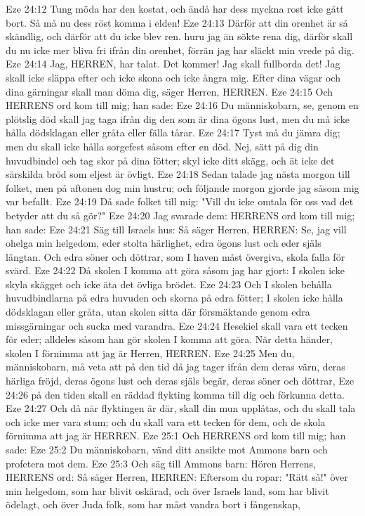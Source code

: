 Eze 24:12  Tung möda har den kostat, och ändå har dess myckna rost icke gått bort. Så må nu dess röst komma i elden!
Eze 24:13  Därför att din orenhet är så skändlig, och därför att du icke blev ren. huru jag än sökte rena dig, därför skall du nu icke mer bliva fri ifrån din orenhet, förrän jag har släckt min vrede på dig.
Eze 24:14  Jag, HERREN, har talat. Det kommer! Jag skall fullborda det! Jag skall icke släppa efter och icke skona och icke ångra mig. Efter dina vägar och dina gärningar skall man döma dig, säger Herren, HERREN.
Eze 24:15  Och HERRENS ord kom till mig; han sade:
Eze 24:16  Du människobarn, se, genom en plötslig död skall jag taga ifrån dig den som är dina ögons lust, men du må icke hålla dödsklagan eller gråta eller fälla tårar.
Eze 24:17  Tyst må du jämra dig; men du skall icke hålla sorgefest såsom efter en död. Nej, sätt på dig din huvudbindel och tag skor på dina fötter; skyl icke ditt skägg, och ät icke det särskilda bröd som eljest är övligt.
Eze 24:18  Sedan talade jag nästa morgon till folket, men på aftonen dog min hustru; och följande morgon gjorde jag såsom mig var befallt.
Eze 24:19  Då sade folket till mig: "Vill du icke omtala för oss vad det betyder att du så gör?"
Eze 24:20  Jag svarade dem: HERRENS ord kom till mig; han sade:
Eze 24:21  Säg till Israels hus: Så säger Herren, HERREN: Se, jag vill ohelga min helgedom, eder stolta härlighet, edra ögons lust och eder själs längtan. Och edra söner och döttrar, som I haven måst övergiva, skola falla för svärd.
Eze 24:22  Då skolen I komma att göra såsom jag har gjort: I skolen icke skyla skägget och icke äta det övliga brödet.
Eze 24:23  Och I skolen behålla huvudbindlarna på edra huvuden och skorna på edra fötter; I skolen icke hålla dödsklagan eller gråta, utan skolen sitta där försmäktande genom edra missgärningar och sucka med varandra.
Eze 24:24  Hesekiel skall vara ett tecken för eder; alldeles såsom han gör skolen I komma att göra. När detta händer, skolen I förnimma att jag är Herren, HERREN.
Eze 24:25  Men du, människobarn, må veta att på den tid då jag tager ifrån dem deras värn, deras härliga fröjd, deras ögons lust och deras själs begär, deras söner och döttrar,
Eze 24:26  på den tiden skall en räddad flykting komma till dig och förkunna detta.
Eze 24:27  Och då när flyktingen är där, skall din mun upplåtas, och du skall tala och icke mer vara stum; och du skall vara ett tecken för dem, och de skola förnimma att jag är HERREN.
Eze 25:1  Och HERRENS ord kom till mig; han sade:
Eze 25:2  Du människobarn, vänd ditt ansikte mot Ammons barn och profetera mot dem.
Eze 25:3  Och säg till Ammons barn: Hören Herrens, HERRENS ord: Så säger Herren, HERREN: Eftersom du ropar: "Rätt så!" över min helgedom, som har blivit oskärad, och över Israels land, som har blivit ödelagt, och över Juda folk, som har måst vandra bort i fångenskap,
